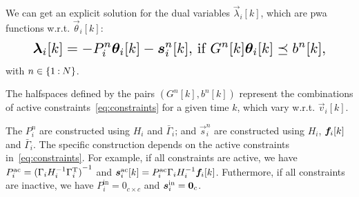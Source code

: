 \documentclass{ifacconf}  %
\begin{document}
We can get an explicit solution for the dual variables $\vec{\lambda}_{i}[k]$, which are \acrfull{pwa} functions w.r.t. $\vec{\theta}_{i}[k]$:
\begin{equation}
\resizebox{.88\columnwidth}{!}{$
  \begin{aligned}\label{eq:lambdafuntheta}
    \lambdaik=
      -P_{i}^{n}\thetaik-\vec{s}_{i}^{n}[k]\text{, if}\ G^{n}[k]\thetaik \preceq b^{n}[k],
  \end{aligned}
  $}
\end{equation}
with $n\in\{1\mathbin{:} N\}$.

The halfspaces defined by the pairs $(G^{n}[k],b^{n}[k])$ represent the combinations of active constraints~\eqref{eq:constraints} for a given time $k$, which vary w.r.t. $\vec{v}_{i}[k]$.

The $P_{i}^{n}$ are constructed using $H_{i}$ and $\bar{\Gamma}_{i}$; and $\vec{s}_{i}^{n}$ are constructed using $H_{i}$, $\fik$ and $\bar{\Gamma}_{i}$. The specific construction depends on the active constraints in~\eqref{eq:constraints}.
For example, if all constraints are active, we have ${P_{i}^{\text{ac}}={(\relax{\Gamma}_{i}H_{i}^{-1}\relax{\Gamma}_{i}^{\mathrm{T}})}^{-1}}$ and ${\vec{s}_{i}^{\text{ac}}[k]=P_{i}^{\text{ac}}\bar{\Gamma}_{i}H_{i}^{-1}\fik}$.
Futhermore, if all constraints are inactive, we have ${P_{i}^{\text{in}}=0_{c\times c}}$ and ${\boldsymbol{s}_{i}^{\text{in}}=\mathbf{0}_{c}}$.

\end{document}
